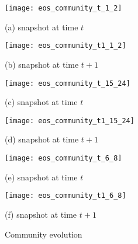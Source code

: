 \begin{figure}[H]
  \centering
  \begin{minipage}[b]{0.4\textwidth}
    \texttt{[image: eos\_community\_t\_1\_2]}
    \caption*{(a) snapshot at time $t$}
  \end{minipage}
  \begin{minipage}[b]{0.4\textwidth}
    \texttt{[image: eos\_community\_t1\_1\_2]}
    \caption*{(b) snapshot at time $t+1$}
  \end{minipage}
  \begin{minipage}[b]{0.4\textwidth}
    \texttt{[image: eos\_community\_t\_15\_24]}
    \caption*{(c) snapshot at time $t$}
  \end{minipage}
  \begin{minipage}[b]{0.4\textwidth}
    \texttt{[image: eos\_community\_t1\_15\_24]}
    \caption*{(d) snapshot at time $t+1$}
  \end{minipage}
  \begin{minipage}[b]{0.4\textwidth}
    \texttt{[image: eos\_community\_t\_6\_8]}
    \caption*{(e) snapshot at time $t$}
  \end{minipage}
  \begin{minipage}[b]{0.4\textwidth}
    \texttt{[image: eos\_community\_t1\_6\_8]}
    \caption*{(f) snapshot at time $t+1$}
  \end{minipage}
  \caption{Community evolution}
  \label{fig:community_evolution_evaluation}
\end{figure}
